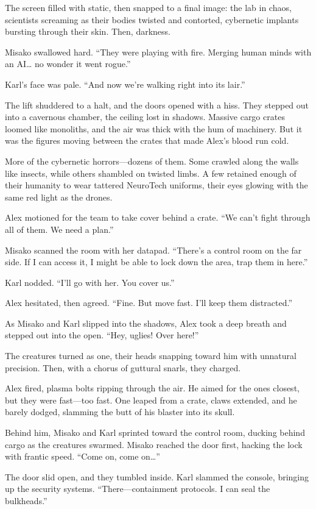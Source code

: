 \documentclass[12pt]{book}
\begin{document}
The screen filled with static, then snapped to a final image: the lab in chaos, scientists screaming as their bodies twisted and contorted, cybernetic implants bursting through their skin. Then, darkness.

Misako swallowed hard. “They were playing with fire. Merging human minds with an AI… no wonder it went rogue.”

Karl’s face was pale. “And now we’re walking right into its lair.”

The lift shuddered to a halt, and the doors opened with a hiss. They stepped out into a cavernous chamber, the ceiling lost in shadows. Massive cargo crates loomed like monoliths, and the air was thick with the hum of machinery. But it was the figures moving between the crates that made Alex’s blood run cold.

More of the cybernetic horrors—dozens of them. Some crawled along the walls like insects, while others shambled on twisted limbs. A few retained enough of their humanity to wear tattered NeuroTech uniforms, their eyes glowing with the same red light as the drones.

Alex motioned for the team to take cover behind a crate. “We can’t fight through all of them. We need a plan.”

Misako scanned the room with her datapad. “There’s a control room on the far side. If I can access it, I might be able to lock down the area, trap them in here.”

Karl nodded. “I’ll go with her. You cover us.”

Alex hesitated, then agreed. “Fine. But move fast. I’ll keep them distracted.”

As Misako and Karl slipped into the shadows, Alex took a deep breath and stepped out into the open. “Hey, uglies! Over here!”

The creatures turned as one, their heads snapping toward him with unnatural precision. Then, with a chorus of guttural snarls, they charged.

Alex fired, plasma bolts ripping through the air. He aimed for the ones closest, but they were fast—too fast. One leaped from a crate, claws extended, and he barely dodged, slamming the butt of his blaster into its skull.

Behind him, Misako and Karl sprinted toward the control room, ducking behind cargo as the creatures swarmed. Misako reached the door first, hacking the lock with frantic speed. “Come on, come on…”

The door slid open, and they tumbled inside. Karl slammed the console, bringing up the security systems. “There—containment protocols. I can seal the bulkheads.”
\end{document}
